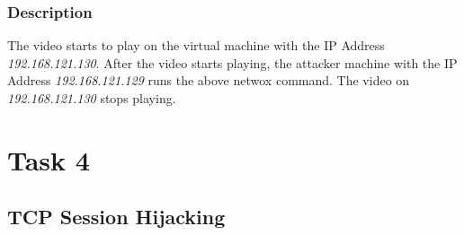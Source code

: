 \documentclass[12pt]{article}
\begin{document}
\subsubsection{Description}
The video starts to play on the virtual machine with the IP Address \emph{192.168.121.130}. After the video starts playing, the attacker machine with the IP Address \emph{192.168.121.129} runs the above netwox command. The video on \emph{192.168.121.130} stops playing.
\pagebreak

\section{Task 4}
\subsection{TCP Session Hijacking}
\enddocument
\end{document}
